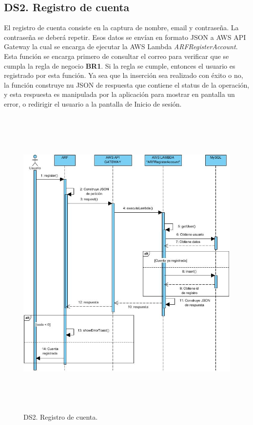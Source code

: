 \clearpage

\subsection{DS2. Registro de cuenta}
El registro de cuenta consiste en la captura de nombre, email y contraseña. La contraseña se deberá repetir. Esos datos se envían en formato JSON a AWS API Gateway la cual se encarga de ejecutar la AWS Lambda \textit{ARFRegisterAccount}. Esta función se encarga primero de consultar el correo para verificar que se cumpla la regla de negocio \textbf{BR1}. Si la regla se cumple, entonces el usuario es registrado por esta función. Ya sea que la inserción sea realizado con éxito o no, la función construye nu JSON de respuesta que contiene el status de la operación, y esta respuesta es manipulada por la aplicación para mostrar en pantalla un error, o redirigir el usuario a la pantalla de Inicio de sesión.

\begin{figure}[h!]
	\centering
	\includegraphics[width=14cm,height=16cm]{imagenes/analisis/ds/RegCuenta.jpg}
	\caption{DS2. Registro de cuenta.}
	\label{fig:dsregcuenta}
\end{figure}
\clearpage

